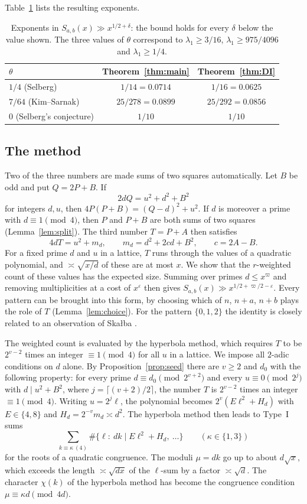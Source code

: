 \documentclass[11pt]{amsart}
\theoremstyle{remark}
\theoremstyle{definition}
\numberwithin{equation}{section}
\newcommand{\eps}{\varepsilon}
\begin{document}
Table~\ref{tab:exponents} lists the resulting exponents.

\begin{table}[h]
\centering
\begin{tabular}{lcc}
\toprule
$\theta$ & Theorem~\ref{thm:main} & Theorem~\ref{thm:DI}\\
\midrule
$1/4$ (Selberg) & $1/14=0.0714$ & $1/16=0.0625$\\
$7/64$ (Kim--Sarnak) & $25/278=0.0899$ & $25/292=0.0856$\\
$0$ (Selberg's conjecture) & $1/10$ & $1/10$\\
\bottomrule
\end{tabular}
\caption{Exponents in $S_{a,b}(x)\gg x^{1/2+\delta}$: the bound holds for every $\delta$ below the value shown. The three values of $\theta$ correspond to $\lambda_1\ge3/16$, $\lambda_1\ge975/4096$ and $\lambda_1\ge1/4$.}
\label{tab:exponents}
\end{table}

\subsection{The method}\label{sec:method}
Two of the three numbers are made sums of two squares automatically. Let $B$ be odd and put $Q=2P+B$. If
\[
2dQ=u^2+d^2+B^2
\]
for integers $d,u$, then $4P(P+B)=(Q-d)^2+u^2$. If $d$ is moreover a prime with $d\equiv1\pmod 4$, then $P$ and $P+B$ are both sums of two squares (Lemma~\ref{lem:split}). The third number $T=P+A$ then satisfies
\[
4dT=u^2+m_d,\qquad m_d=d^2+2cd+B^2,\qquad c=2A-B.
\]
For a fixed prime $d$ and $u$ in a lattice, $T$ runs through the values of a quadratic polynomial, and $\asymp\sqrt{x/d}$ of these are at most $x$. We show that the $r$-weighted count of these values has the expected size. Summing over primes $d\le x^{\varpi}$ and removing multiplicities at a cost of $x^{\eps}$ then gives $S_{a,b}(x)\gg x^{1/2+\varpi/2-\eps}$. Every pattern can be brought into this form, by choosing which of $n$, $n+a$, $n+b$ plays the role of $T$ (Lemma~\ref{lem:choice}). For the pattern $\{0,1,2\}$ the identity is closely related to an observation of Ska{\l}ba \cite{Sk}.

The weighted count is evaluated by the hyperbola method, which requires $T$ to be $2^{v-2}$ times an integer $\equiv1\pmod 4$ for all $u$ in a lattice. We impose all $2$-adic conditions on $d$ alone. By Proposition~\ref{prop:seed} there are $v\ge2$ and $d_0$ with the following property: for every prime $d\equiv d_0\pmod{2^{v+2}}$ and every $u\equiv0\pmod{2^j}$ with $d\mid u^2+B^2$, where $j=\lceil(v+2)/2\rceil$, the number $T$ is $2^{v-2}$ times an integer $\equiv1\pmod 4$. Writing $u=2^j\ell$, the polynomial becomes $2^v(E\ell^2+H_d)$ with $E\in\{4,8\}$ and $H_d=2^{-v}m_d\asymp d^2$. The hyperbola method then leads to Type~I sums
\[
\sum_{k\equiv\kappa\ (4)}\#\{\ell:\ dk\mid E\ell^2+H_d,\ \dots\}\qquad(\kappa\in\{1,3\})
\]
for the roots of a quadratic congruence. The moduli $\mu=dk$ go up to about $d\sqrt x$, which exceeds the length $\asymp\sqrt{dx}$ of the $\ell$-sum by a factor $\asymp\sqrt d$. The character $\chi(k)$ of the hyperbola method has become the congruence condition $\mu\equiv\kappa d\pmod{4d}$.
\end{document}
